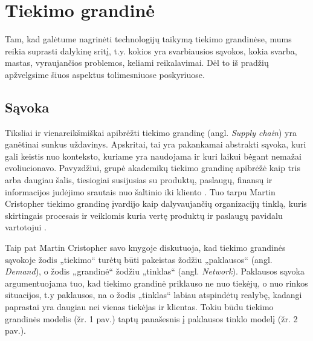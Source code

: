 
\section {Tiekimo grandinė}

Tam, kad galėtume nagrinėti technologijų taikymą tiekimo grandinėse, mums reikia suprasti dalykinę sritį, t.y. kokios yra svarbiausios sąvokos, kokia svarba, mastas, vyraujančios problemos, keliami reikalavimai. Dėl to iš pradžių apžvelgsime šiuos aspektus tolimesniuose poskyriuose.




\subsection{Sąvoka}

Tiksliai ir vienareikšmiškai apibrėžti tiekimo grandinę (angl. \textit{Supply chain}) yra ganėtinai sunkus uždavinys. Apskritai, tai yra pakankamai abstrakti sąvoka, kuri gali keistis nuo konteksto, kuriame yra naudojama ir kuri laikui bėgant nemažai evoliucionavo. Pavyzdžiui, grupė akademikų tiekimo grandinę apibrėžė kaip tris arba daugiau šalis, tiesiogiai susijusias su produktų, paslaugų, finansų ir informacijos judėjimo srautais nuo šaltinio iki kliento \cite{mentzer2001defining}. Tuo tarpu Martin Cristopher tiekimo grandinę įvardijo kaip dalyvaujančių organizacijų tinklą, kuris skirtingais procesais ir veiklomis kuria vertę produktų ir paslaugų pavidalu vartotojui \cite{christopher2016logistics}. 

Taip pat Martin Cristopher savo knygoje diskutuoja, kad tiekimo grandinės sąvokoje žodis „tiekimo“ turėtų būti pakeistas žodžiu „paklausos“ (angl. \textit{Demand}), o žodis „grandinė“ žodžiu „tinklas“ (angl. \textit{Network}). Paklausos sąvoka argumentuojama tuo, kad tiekimo grandinė priklauso ne nuo tiekėjų, o nuo rinkos situacijos, t.y paklausos, na o žodis „tinklas“ labiau atspindėtų realybę, kadangi paprastai yra daugiau nei vienas tiekėjas ir klientas. Tokiu būdu tiekimo grandinės modelis (žr. 1 pav.) taptų panašesnis į paklausos tinklo modelį (žr. 2 pav.).

